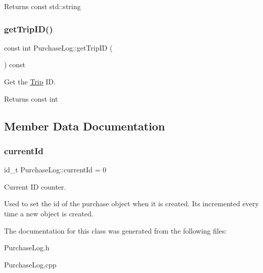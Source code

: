 \begin{DoxyReturn}{Returns}
const std\+::string 
\end{DoxyReturn}
\mbox{\label{classPurchaseLog_ac50b5fd8eb060b67405e5234e3cc604b}} 
\subsubsection{\texorpdfstring{get\+Trip\+I\+D()}{getTripID()}}
{\footnotesize\ttfamily const int Purchase\+Log\+::get\+Trip\+ID (\begin{DoxyParamCaption}{ }\end{DoxyParamCaption}) const}



Get the \mbox{\hyperlink{classTrip}{Trip}} ID. 

\begin{DoxyReturn}{Returns}
const int 
\end{DoxyReturn}


\subsection{Member Data Documentation}
\mbox{\label{classPurchaseLog_a175b76f4fd112806badc0ea294bccca5}} 
\subsubsection{\texorpdfstring{current\+Id}{currentId}}
{\footnotesize\ttfamily id\+\_\+t Purchase\+Log\+::current\+Id = 0\hspace{0.3cm}{\ttfamily [static]}}



Current ID counter. 

Used to set the id of the purchase object when it is created. It\textquotesingle{}s incremented every time a new object is created. 

The documentation for this class was generated from the following files\+:\begin{DoxyCompactItemize}
\item 
Purchase\+Log.\+h\item 
Purchase\+Log.\+cpp\end{DoxyCompactItemize}
